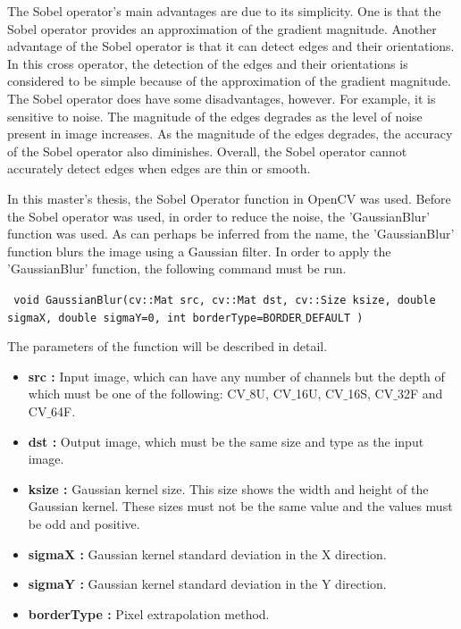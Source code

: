 The Sobel operator's main advantages are due to its simplicity. One is that the Sobel operator provides an approximation of the gradient magnitude. Another advantage of the Sobel operator is that it can detect edges and their orientations. In this cross operator, the detection of the edges and their orientations is considered to be simple because of the approximation of the gradient magnitude. The Sobel operator does have some disadvantages, however. For example, it is sensitive to noise. The magnitude of the edges degrades as the level of noise present in image increases. As the magnitude of the edges degrades, the accuracy of the Sobel operator also diminishes. Overall, the Sobel operator cannot accurately detect edges when edges are thin or smooth.



In this master's thesis, the Sobel Operator function in OpenCV was used. Before the Sobel operator was used, in order to reduce the noise, the 'GaussianBlur' function was used. As can perhaps be inferred from the name, the 'GaussianBlur' function blurs the image using a Gaussian filter. In order to apply the 'GaussianBlur' function, the following command must be run.

 \begin{center}
  
\texttt{ void GaussianBlur(cv::Mat src, cv::Mat dst, cv::Size ksize, double sigmaX, double sigmaY=0, int borderType=BORDER$\_$DEFAULT )}

  \end{center}

The parameters of the function will be described in detail.\cite{GaussianBlur}
 
\begin{itemize}

\item \textbf{src : }Input image, which can have any number of channels but the depth of which must be one of the following: CV$\_$8U, CV$\_$16U, CV$\_$16S, CV$\_$32F and CV$\_$64F.
 
\item \textbf{dst : }Output image, which must be the same size and type as the input image.

\item \textbf{ksize : }Gaussian kernel size. This size shows the width and height of the Gaussian kernel. These sizes must not be the same value and the values must be odd and positive.

\item \textbf{sigmaX : }Gaussian kernel standard deviation in the X direction.

\item \textbf{sigmaY : }Gaussian kernel standard deviation in the Y direction.

\item \textbf{borderType : }Pixel extrapolation method.

\end{itemize}


